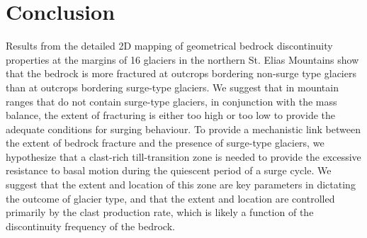 \documentclass[draft,linenumbers]{agujournal}
\begin{document}
%
%
%




\section{Conclusion}

Results from the detailed 2D mapping of geometrical bedrock discontinuity properties at the margins of 16 glaciers in the northern St. Elias Mountains show that the bedrock is more fractured at outcrops bordering non-surge type glaciers than at outcrops bordering surge-type glaciers. We suggest that in mountain ranges that do not contain surge-type glaciers, in conjunction with the mass balance, the extent of fracturing is either too high or too low to provide the adequate conditions for surging behaviour. To provide a mechanistic link between the extent of bedrock fracture and the presence of surge-type glaciers, we hypothesize that a clast-rich till-transition zone is needed to provide the excessive resistance to basal motion during the quiescent period of a surge cycle. We suggest that the extent and location of this zone are key parameters in dictating the outcome of glacier type, and that the extent and location are controlled primarily by the clast production rate, which is likely a function of the discontinuity frequency of the bedrock. 
\end{document}
